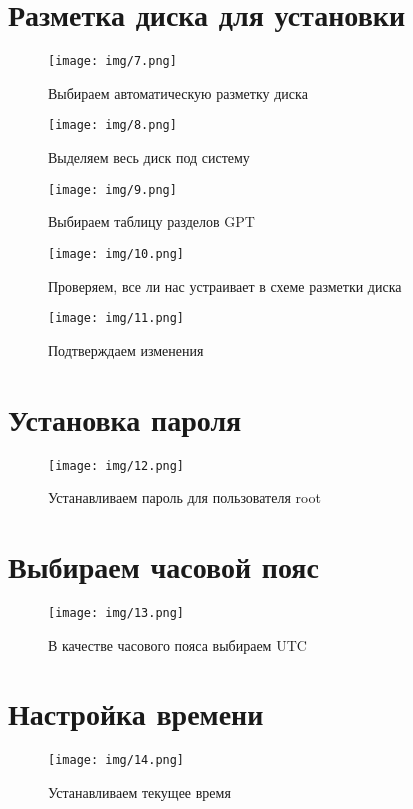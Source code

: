 \documentclass{gost}
\begin{document}
	\section{Разметка диска для установки}
		\begin{figure}[H]
			\texttt{[image: img/7.png]}
			\caption{Выбираем автоматическую разметку диска}
		\end{figure}

		\begin{figure}[H]
			\texttt{[image: img/8.png]}
			\caption{Выделяем весь диск под систему}
		\end{figure}

		\begin{figure}[H]
			\texttt{[image: img/9.png]}
			\caption{Выбираем таблицу разделов GPT}
		\end{figure}

		\begin{figure}[H]
			\texttt{[image: img/10.png]}
			\caption{Проверяем, все ли нас устраивает в схеме разметки диска}
		\end{figure}

		\begin{figure}[H]
			\texttt{[image: img/11.png]}
			\caption{Подтверждаем изменения}
		\end{figure}

	\section{Установка пароля}
		\begin{figure}[H]
			\texttt{[image: img/12.png]}
			\caption{Устанавливаем пароль для пользователя root}
		\end{figure}

	\section{Выбираем часовой пояс}
		\begin{figure}[H]
			\texttt{[image: img/13.png]}
			\caption{В качестве часового пояса выбираем UTC}
		\end{figure}

	\section{Настройка времени}
		\begin{figure}[H]
			\texttt{[image: img/14.png]}
			\caption{Устанавливаем текущее время}
		\end{figure}
\end{document}

